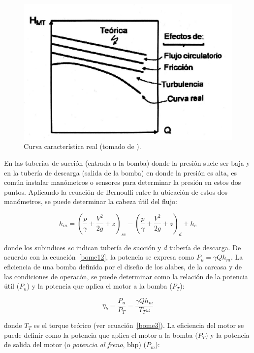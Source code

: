 \documentclass[11pt, oneside]{article}
\begin{document}
\begin{figure}[h]
\centering
\includegraphics[width=12cm]{./figs/bom4.jpeg}
\caption{Curva caracter\'istica real (tomado de \cite{agudelo2011mecanica}).} 
\label{bom4}
\end{figure}

En las tuber\'ias de succi\'on (entrada a la bomba) donde la presi\'on suele ser baja y en la tuber\'ia de descarga (salida de la bomba) en donde la presi\'on es alta, es com\'un instalar man\'ometros o sensores para determinar la presi\'on en estos dos puntos. Aplicando la ecuaci\'on de Bernoulli entre la ubicaci\'on de estos dos man\'ometros, se puede determinar la cabeza \'util del flujo:


\begin{equation}
h_m = \left(\frac{p}{\gamma} + \frac{V^2}{2g} + z \right)_{sc} - \left(\frac{p}{\gamma} + \frac{V^2}{2g} + z \right)_{d} + h_e
\label{bome12}
\end{equation}

donde los subindices $sc$ indican tuber\'ia de succi\'on y $d$ tuber\'ia de descarga. De acuerdo con la ecuaci\'on~\ref{bome12}, la potencia se expresa como $P_u = \gamma Q h_m$. La eficiencia de una bomba definida por el dise\~no de los alabes, de la carcasa y de las condiciones de operac\'on, se puede determinar como la relaci\'on de la potencia \'util ($P_u$) y la potencia que aplica el motor a la bomba ($P_T$):

\begin{equation}
\eta_b = \frac{P_u}{P_T} = \frac{\gamma Q h_m}{T_T \omega}
\label{bome13}
\end{equation}

donde $T_T$ es el torque te\'orico (ver ecuaci\'on~\ref{bome3}). La eficiencia del motor se puede definir como la potencia que aplica el motor a la bomba ($P_T$) y la potencia de salida del motor (o \emph{potencia al freno}, bhp) ($P_m$):
\end{document}
